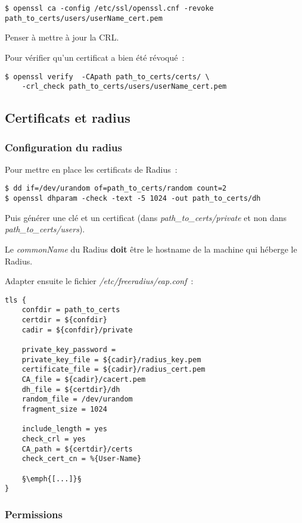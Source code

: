 \begin{lstlisting}
$ openssl ca -config /etc/ssl/openssl.cnf -revoke path_to_certs/users/userName_cert.pem
\end{lstlisting}

Penser à mettre à jour la CRL.

Pour vérifier qu'un certificat a bien été révoqué~:

\begin{lstlisting}
$ openssl verify  -CApath path_to_certs/certs/ \
    -crl_check path_to_certs/users/userName_cert.pem
\end{lstlisting}

\subsection{Certificats et radius}
\subsubsection{Configuration du radius}

Pour mettre en place les certificats de Radius~: 

\begin{lstlisting}
$ dd if=/dev/urandom of=path_to_certs/random count=2
$ openssl dhparam -check -text -5 1024 -out path_to_certs/dh
\end{lstlisting}

Puis générer une clé et un certificat (dans \emph{path\_to\_certs/private} et non dans \emph{path\_to\_certs/users}).

Le \emph{commonName} du Radius \textbf{doit} être le hostname de la machine qui héberge le Radius.

Adapter ensuite le fichier \emph{/etc/freeradius/eap.conf}~:

\begin{lstlisting}
tls {
	confdir = path_to_certs 
	certdir = ${confdir}
	cadir = ${confdir}/private

	private_key_password =
	private_key_file = ${cadir}/radius_key.pem
	certificate_file = ${cadir}/radius_cert.pem
	CA_file = ${cadir}/cacert.pem
	dh_file = ${certdir}/dh
	random_file = /dev/urandom
	fragment_size = 1024

	include_length = yes
	check_crl = yes
	CA_path = ${certdir}/certs
	check_cert_cn = %{User-Name}

	§\emph{[...]}§
}
\end{lstlisting}

\subsubsection{Permissions}

